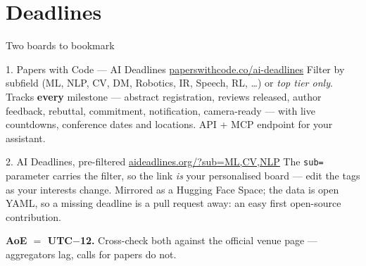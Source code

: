 \documentclass[aspectratio=169,11pt]{beamer}
\newcommand{\code}[1]{\texttt{\small #1}}
\newcommand{\lnk}[2]{\href{#1}{\color{brandlight}\underline{#2}}}
\newcommand{\key}[1]{\textbf{\color{brand}#1}}
\begin{document}
\section{Deadlines}

\begin{frame}{Two boards to bookmark}
\begin{block}{1. Papers with Code --- AI Deadlines \quad \lnk{https://paperswithcode.co/ai-deadlines}{paperswithcode.co/ai-deadlines}}
\footnotesize
Filter by subfield (ML, NLP, CV, DM, Robotics, IR,
Speech, RL, \ldots) or \emph{top tier only}. Tracks \key{every} milestone ---
abstract registration, reviews released, author feedback, rebuttal,
commitment, notification, camera-ready --- with live countdowns, conference
dates and locations. API + MCP endpoint for your assistant.
\end{block}
\begin{block}{2. AI Deadlines, pre-filtered \quad \lnk{http://aideadlines.org/?sub=ML,CV,NLP}{aideadlines.org/?sub=ML,CV,NLP}}
\footnotesize
The \code{sub=} parameter carries the filter, so the link \emph{is} your
personalised board --- edit the tags as your interests change. Mirrored as a
Hugging Face Space; the data is open YAML, so a missing deadline is a pull
request away: an easy first open-source contribution.
\end{block}
\centering\footnotesize
\key{AoE $=$ UTC$-$12.} Cross-check both against the official venue page ---
aggregators lag, calls for papers do not.
\end{frame}
\end{document}
